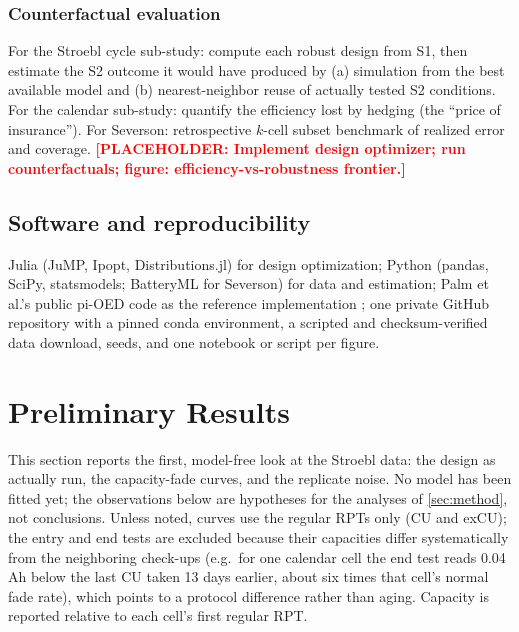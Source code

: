 \documentclass[11pt,letterpaper]{article}
\newcommand{\ph}[1]{\textcolor{red}{\textbf{[PLACEHOLDER: #1]}}}
\begin{document}
\subsubsection{Counterfactual evaluation}
For the Stroebl cycle sub-study: compute each robust design from S1, then estimate the S2 outcome it would have produced by (a) simulation from the best available model and (b) nearest-neighbor reuse of actually tested S2 conditions. For the calendar sub-study: quantify the efficiency lost by hedging (the ``price of insurance''). For Severson: retrospective $k$-cell subset benchmark of realized error and coverage. \ph{Implement design optimizer; run counterfactuals; figure: efficiency-vs-robustness frontier.}

\subsection{Software and reproducibility}
Julia (JuMP, Ipopt, Distributions.jl) for design optimization; Python (pandas, SciPy, statsmodels; BatteryML for Severson) for data and estimation; Palm et al.'s public pi-OED code as the reference implementation \cite{palm2022}; one private GitHub repository with a pinned conda environment, a scripted and checksum-verified data download, seeds, and one notebook or script per figure.

\section{Preliminary Results}\label{sec:prelim}
This section reports the first, model-free look at the Stroebl data: the design as actually run, the capacity-fade curves, and the replicate noise. No model has been fitted yet; the observations below are hypotheses for the analyses of \cref{sec:method}, not conclusions. Unless noted, curves use the regular RPTs only (CU and exCU); the entry and end tests are excluded because their capacities differ systematically from the neighboring check-ups (e.g.\ for one calendar cell the end test reads 0.04\,Ah below the last CU taken 13 days earlier, about six times that cell's normal fade rate), which points to a protocol difference rather than aging. Capacity is reported relative to each cell's first regular RPT.
\end{document}

